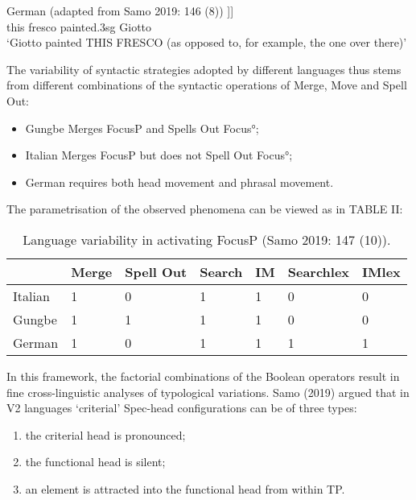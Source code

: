 \documentclass[fleqn,10pt]{wlscirep}
\begin{document}
\begin{exe}
    \ex	German (adapted from Samo 2019: 146 (8))
		\gll [\textsubscript{SpecFoc} 	DIESES 	FRESKO 	[\textsubscript{Focus^0} 	malte				[	Giotto ]]]\\
		{} this 			fresco			{}		painted.3sg	{}	Giotto \\
        \vspace*{-3mm}
		\glt ‘Giotto painted THIS FRESCO (as opposed to, for example, the one over there)’
\end{exe}

The variability of syntactic strategies adopted by different languages thus stems from different combinations of the syntactic operations of Merge, Move and Spell Out: 

\begin{itemize}
\item Gungbe Merges FocusP and Spells Out Focus°; 
\item \vspace*{-2mm} Italian Merges FocusP but does not Spell Out Focus°; 
\item \vspace*{-2mm} German requires both head movement and phrasal movement. 
\end{itemize}

The parametrisation of the observed phenomena can be viewed as in TABLE II:

\begin{table}[ht]
    \centering
    \begin{tabular}{|l|l|l|l|l|l|l|}
    \hline
     & Merge & Spell Out & Search & IM & Searchlex & IMlex \\
    \hline
    Italian & 1 & 0 & 1 & 1 & 0 & 0 \\
    \hline
    Gungbe & 1 & 1 & 1 & 1 & 0 & 0 \\
    \hline
    German & 1 & 0 & 1 & 1 & 1 & 1 \\
    \hline
    \end{tabular}
    \caption{\label{tab:samp}Language variability in activating FocusP (Samo 2019: 147 (10)).}
    \end{table}

In this framework, the factorial combinations of the Boolean operators result in fine cross-linguistic analyses of typological variations. Samo (2019) argued that in V2 languages ‘criterial’ Spec-head configurations can be of three types: 

\begin{enumerate}[i]
    \item the criterial head is pronounced; 
    \item the functional head is silent; 
    \item an element is attracted into the functional head from within TP. 
\end{enumerate}
\end{document}
